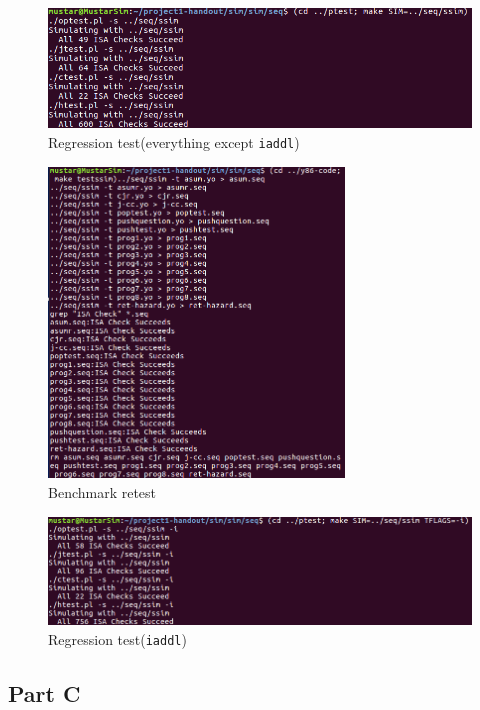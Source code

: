 \documentclass{article}
\begin{document}
	\begin{figure}[H]
		\centering
		\includegraphics[width=\textwidth]{regression test}
		\caption{Regression test(everything except \texttt{iaddl})}
		\end{figure}

    \begin{figure}[H]
	\centering
	\includegraphics[width=0.7\textwidth]{benchmark retest}
	\caption{Benchmark retest}
	\end{figure}

    \begin{figure}[H]
	\centering
	\includegraphics[width=\textwidth]{iaddl test}
	\caption{Regression test(\texttt{iaddl})}
	\end{figure}
\subsection{Part C}
\end{document}

